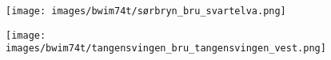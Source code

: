 
\begin{figure}[H]
    \centering
    \texttt{[image: images/bwim74t/sørbryn\_bru\_svartelva.png]}
\end{figure}
            
\begin{figure}[H]
    \centering
    \texttt{[image: images/bwim74t/tangensvingen\_bru\_tangensvingen\_vest.png]}
\end{figure}
            
